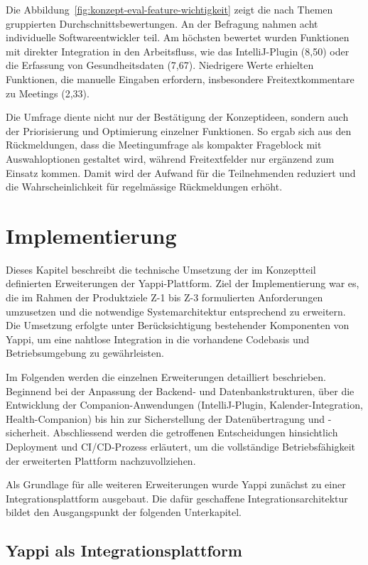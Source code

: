 \documentclass[12pt,a4paper]{report}
\begin{document}
Die Abbildung~\ref{fig:konzept-eval-feature-wichtigkeit} zeigt die nach Themen gruppierten Durchschnittsbewertungen.
An der Befragung nahmen acht individuelle Softwareentwickler teil.
Am höchsten bewertet wurden Funktionen mit direkter Integration in den Arbeitsfluss, wie das IntelliJ-Plugin (8,50)
oder die Erfassung von Gesundheitsdaten (7,67).
Niedrigere Werte erhielten Funktionen, die manuelle Eingaben erfordern, insbesondere Freitextkommentare zu Meetings (2,33).

Die Umfrage diente nicht nur der Bestätigung der Konzeptideen, sondern auch der Priorisierung und Optimierung einzelner Funktionen.
So ergab sich aus den Rückmeldungen, dass die Meetingumfrage als kompakter Frageblock mit Auswahloptionen gestaltet wird,
während Freitextfelder nur ergänzend zum Einsatz kommen.
Damit wird der Aufwand für die Teilnehmenden reduziert und die Wahrscheinlichkeit für regelmässige Rückmeldungen erhöht.

\chapter{Implementierung}

Dieses Kapitel beschreibt die technische Umsetzung der im Konzeptteil definierten Erweiterungen der Yappi-Plattform. Ziel der 
Implementierung war es, die im Rahmen der Produktziele Z-1 bis Z-3 formulierten Anforderungen umzusetzen und die notwendige
Systemarchitektur entsprechend zu erweitern. Die Umsetzung erfolgte unter Berücksichtigung bestehender Komponenten von Yappi, um
eine nahtlose Integration in die vorhandene Codebasis und Betriebsumgebung zu gewährleisten.

Im Folgenden werden die einzelnen Erweiterungen detailliert beschrieben. Beginnend bei der Anpassung der Backend- und
Datenbankstrukturen, über die Entwicklung der Companion-Anwendungen (IntelliJ-Plugin, Kalender-Integration, Health-Companion) bis
hin zur Sicherstellung der Datenübertragung und -sicherheit. Abschliessend werden die getroffenen Entscheidungen hinsichtlich
Deployment und CI/CD-Prozess erläutert, um die vollständige Betriebsfähigkeit der erweiterten Plattform nachzuvollziehen.

Als Grundlage für alle weiteren Erweiterungen wurde Yappi zunächst zu einer Integrationsplattform ausgebaut. Die dafür geschaffene
Integrationsarchitektur bildet den Ausgangspunkt der folgenden Unterkapitel.

\section{Yappi als Integrationsplattform}
\end{document}
